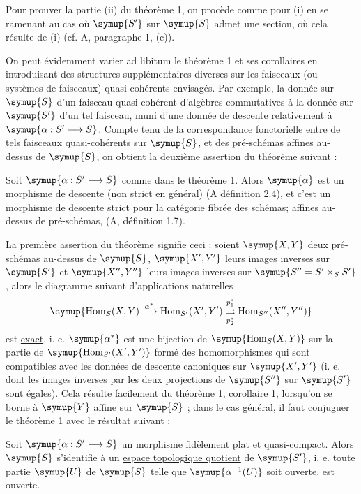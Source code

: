 Pour prouver la partie (ii) du théorème 1, on procède comme pour (i) en se
ramenant au cas où $\symup{S'}$ sur $\symup{S}$ admet une section, où cela résulte de (i)
(cf. A, paragraphe 1, (c)).

On peut évidemment varier ad libitum le théorème 1 et ses corollaires en
introduisant des structures supplémentaires diverses sur les faisceaux (ou
systèmes de faisceaux) quasi-cohérents envisagés. Par exemple, la donnée sur
$\symup{S}$ d'un faisceau
quasi-cohérent d'algèbres commutatives  à la donnée sur $\symup{S'}$ d'un
tel faisceau, muni d'une donnée de descente relativement à
$\symup{\alpha:S'\longrightarrow S}$. Compte tenu de la correspondance fonctorielle
entre de tels faisceaux quasi-cohérents sur $\symup{S}$, et des pré-schémas affines
au-dessus de $\symup{S}$, on obtient la deuxième assertion du théorème suivant :

 Soit $\symup{\alpha:S'\longrightarrow S}$ comme dans le
théorème 1. Alors $\symup{\alpha}$ est un \uline{morphisme de descente} (non strict en
général) (A définition 2.4), et c'est un \uline{morphisme de descente strict}
pour la catégorie fibrée des schémas; affines au-dessus de pré-schémas,
(A, définition 1.7).

La première assertion du théorème signifie ceci : soient $\symup{X,Y}$ deux
pré-schémas au-dessus de $\symup{S}$, $\symup{X',Y'}$ leurs images inverses sur $\symup{S'}$ et
$\symup{X'',Y''}$ leurs images inverses sur $\symup{S''=S'\times_SS'}$, alors le diagramme
suivant d'applications naturelles
\[
  \symup{\operatorname{Hom}_S(X,Y)\xrightarrow{\alpha^*}
  \operatorname{Hom}_{S'}(X',Y')
  \underset{p_2^*}{\overset{p_1^*}{\rightrightarrows}}
  \operatorname{Hom}_{S''}(X'',Y'')}
\]
est \uline{exact}, i. e. $\symup{\alpha^*}$ est une bijection de
$\symup{\operatorname{Hom}_S(X,Y)}$ sur la partie de
$\symup{\operatorname{Hom}_{S'}(X',Y')}$ formé des homomorphismes qui sont compatibles
avec les données de descente canoniques sur $\symup{X',Y'}$ (i. e. dont les images
inverses par les deux projections de $\symup{S''}$ sur $\symup{S'}$ sont égales). Cela résulte
facilement du théorème 1, corollaire 1, lorsqu'on se borne à $\symup{Y}$ affine sur
$\symup{S}$ ; dans le cas général, il faut conjuguer le théorème 1 avec le résultat
suivant :

 Soit $\symup{\alpha:S'\longrightarrow S}$ un morphisme fidèlement
plat et quasi-compact. Alors $\symup{S}$ s'identifie à un \uline{espace topologique quotient} de $\symup{S'}$, i. e. toute partie $\symup{U}$ de $\symup{S}$ telle que
$\symup{\alpha^{-1}(U)}$ soit ouverte, est ouverte.

